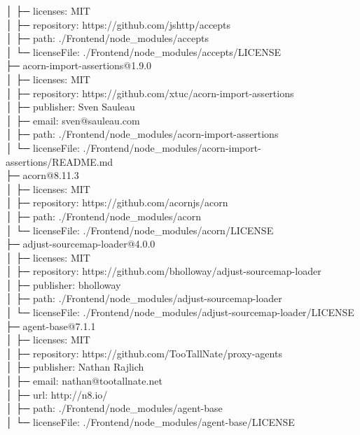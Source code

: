 \documentclass[
    paper=a4,
    twoside=false,
    parskip=half,
    listof=entryprefix,
    listof=totoc,
    index=totoc,
    bibliography=totoc,
    headsepline,
]{scrbook}
\begin{document}
    │  ├─ licenses: MIT\\
    │  ├─ repository: https://github.com/jshttp/accepts\\
    │  ├─ path: ./Frontend/node\_modules/accepts\\
    │  └─ licenseFile: ./Frontend/node\_modules/accepts/LICENSE\\
    ├─ acorn-import-assertions@1.9.0\\
    │  ├─ licenses: MIT\\
    │  ├─ repository: https://github.com/xtuc/acorn-import-assertions\\
    │  ├─ publisher: Sven Sauleau\\
    │  ├─ email: sven@sauleau.com\\
    │  ├─ path: ./Frontend/node\_modules/acorn-import-assertions\\
    │  └─ licenseFile: ./Frontend/node\_modules/acorn-import-assertions/README.md\\
    ├─ acorn@8.11.3\\
    │  ├─ licenses: MIT\\
    │  ├─ repository: https://github.com/acornjs/acorn\\
    │  ├─ path: ./Frontend/node\_modules/acorn\\
    │  └─ licenseFile: ./Frontend/node\_modules/acorn/LICENSE\\
    ├─ adjust-sourcemap-loader@4.0.0\\
    │  ├─ licenses: MIT\\
    │  ├─ repository: https://github.com/bholloway/adjust-sourcemap-loader\\
    │  ├─ publisher: bholloway\\
    │  ├─ path: ./Frontend/node\_modules/adjust-sourcemap-loader\\
    │  └─ licenseFile: ./Frontend/node\_modules/adjust-sourcemap-loader/LICENSE\\
    ├─ agent-base@7.1.1\\
    │  ├─ licenses: MIT\\
    │  ├─ repository: https://github.com/TooTallNate/proxy-agents\\
    │  ├─ publisher: Nathan Rajlich\\
    │  ├─ email: nathan@tootallnate.net\\
    │  ├─ url: http://n8.io/\\
    │  ├─ path: ./Frontend/node\_modules/agent-base\\
    │  └─ licenseFile: ./Frontend/node\_modules/agent-base/LICENSE\\
\end{document}
